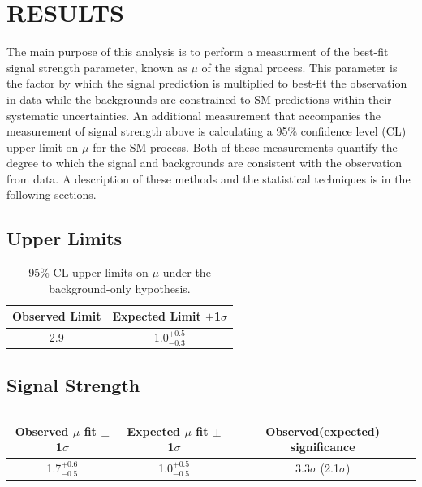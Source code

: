 %
%

\chapter{RESULTS}
The main purpose of this analysis is to perform a measurment of the best-fit signal strength parameter, known as $\mu$ of the \tth signal process. This parameter
is the factor by which the \tth signal prediction is multiplied to best-fit the observation in data while the backgrounds are constrained
to SM predictions within their systematic uncertainties. An additional measurement that accompanies the measurement of signal strength above
is calculating a 95$\%$ confidence level (CL) upper limit on $\mu$ for the SM \tth process. Both of these measurements quantify the degree to which the signal
and backgrounds are consistent with the observation from data. A description of these methods and the statistical techniques is in the following sections.


\section{Upper Limits}

\begin{table}[htbp]
\begin{center}
  \caption[Table of Final Limits]{95$\%$ CL upper limits on $\mu$ under the background-only hypothesis.}
    \begin{tabular}{c c} \hline
      Observed Limit & Expected Limit $\pm$1$\sigma$  \\ \hline 
      2.9 & 1.0$^{+0.5}_{-0.3}$  \\
      \hline
    \end{tabular}
    \label{tab:limits}
\end{center}
\end{table}

\section{Signal Strength}

\begin{table}[htbp]
\begin{center}
  \caption[Table of best-fit signal strength]{}
    \begin{tabular}{c c c} \hline
      Observed $\mu$ fit $\pm$1$\sigma$ & Expected $\mu$ fit $\pm$1$\sigma$ & Observed(expected) significance & \\ \hline 
      1.7$^{+0.6}_{-0.5}$ & 1.0$^{+0.5}_{-0.5}$ & 3.3$\sigma$ (2.1$\sigma$)  \\
      \hline
    \end{tabular}
    \label{tab:mu}
\end{center}
\end{table}


